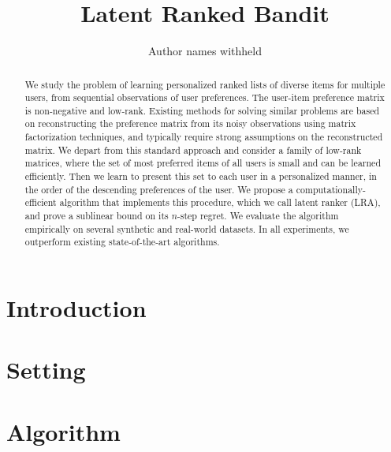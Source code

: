 \documentclass[letterpaper]{article} %
\begin{document}
%
\title{Latent Ranked Bandit}
\author{Author names withheld}
\maketitle
\begin{abstract}
We study the problem of learning personalized ranked lists of diverse items for multiple users, from sequential observations of user preferences. The user-item preference matrix is non-negative and low-rank. Existing methods for solving similar problems are based on reconstructing the preference matrix from its noisy observations using matrix factorization techniques, and typically require strong assumptions on the reconstructed matrix. We depart from this standard approach and consider a family of low-rank matrices, where the set of most preferred items of all users is small and can be learned efficiently. Then we learn to present this set to each user in a personalized manner, in the order of the descending preferences of the user. We propose a computationally-efficient algorithm that implements this procedure, which we call latent ranker (LRA), and prove a sublinear bound on its $n$-step regret. We evaluate the algorithm empirically on several synthetic and real-world datasets. In all experiments, we outperform existing state-of-the-art algorithms.
\end{abstract}

\section{Introduction}
\label{sec:introduction}


\section{Setting}
\label{sec:setting}


\section{Algorithm}
\label{sec:algorithm}

\end{document}
